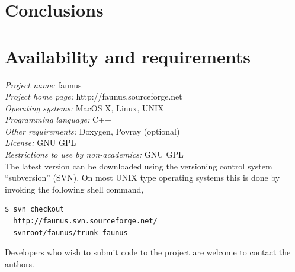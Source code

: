\documentclass[10pt]{bmc_article}
\newenvironment{bmcformat}{\fussy\setboolean{publ}{true}}{\fussy}
\begin{document}
\begin{bmcformat}



    

\section*{Conclusions}

\section*{Availability and requirements}
\textsl{Project name:} faunus\\
\textsl{Project home page:} http://faunus.sourceforge.net\\
\textsl{Operating systems:} MacOS X, Linux, UNIX\\
\textsl{Programming language:} C++\\
\textsl{Other requirements:} Doxygen, Povray (optional)\\
\textsl{License:} GNU GPL\\
\textsl{Restrictions to use by non-academics:} GNU GPL\\

The latest version can be downloaded using the versioning control system ``subversion'' (SVN).
On most UNIX type operating systems this is done by invoking the following shell command,
\begin{verbatim}
$ svn checkout
  http://faunus.svn.sourceforge.net/
  svnroot/faunus/trunk faunus
\end{verbatim}
Developers who wish to submit code to the project are welcome to contact the authors.



    


\end{bmcformat}
\end{document}
